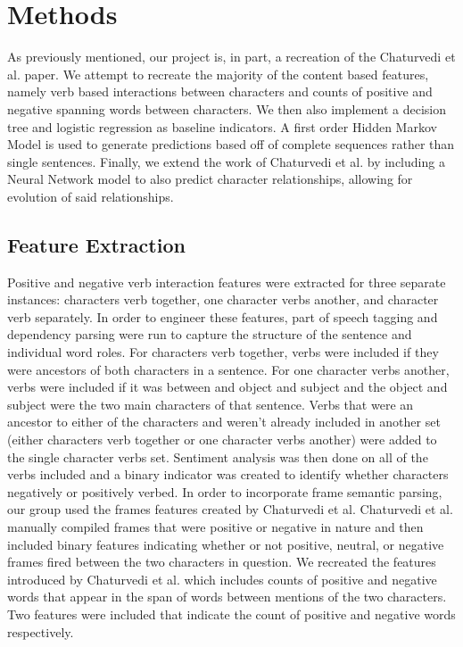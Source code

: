 \documentclass[11pt,a4paper]{article}
\begin{document}
\section{Methods}
As previously mentioned, our project is, in part, a recreation of the Chaturvedi et al. paper. We attempt to recreate the majority of the content based features, namely verb based interactions between characters and counts of positive and negative spanning words between characters. We then also implement a decision tree and logistic regression as baseline indicators. A first order Hidden Markov Model is used to generate predictions based off of complete sequences rather than single sentences. Finally, we extend the work of Chaturvedi et al. by including a Neural Network model to also predict character relationships, allowing for evolution of said relationships.

\subsection{Feature Extraction}
Positive and negative verb interaction features were extracted for three separate instances: characters verb together, one character verbs another, and character verb separately. In order to engineer these features, part of speech tagging and dependency parsing were run to capture the structure of the sentence and individual word roles. For characters verb together, verbs were included if they were ancestors of both characters in a sentence. For one character verbs another, verbs were included if it was between and object and subject and the object and subject were the two main characters of that sentence. Verbs that were an ancestor to either of the characters and weren't already included in another set (either characters verb together or one character verbs another) were added to the single character verbs set. Sentiment analysis was then done on all of the verbs included and a binary indicator was created to identify whether characters negatively or positively verbed. 
In order to incorporate frame semantic parsing, our group used the frames features created by Chaturvedi et al. Chaturvedi et al. manually compiled frames that were positive or negative in nature and then included binary features indicating whether or not positive, neutral, or negative frames fired between the two characters in question.
We recreated the features introduced by Chaturvedi et al. which includes counts of positive and negative words that appear in the span of words between mentions of the two characters. Two features were included that indicate the count of positive and negative words respectively.
\end{document}
